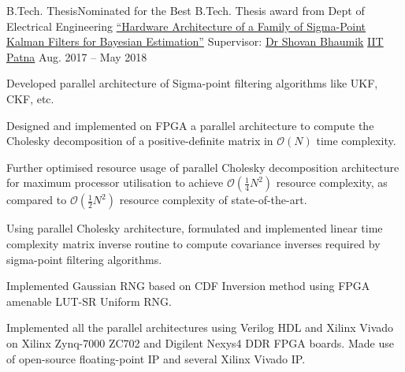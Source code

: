 \begin{cvexperience}
\cvposition
	{B.Tech. Thesis\quad\textbar\quad Nominated for the Best B.Tech. Thesis award from Dept of Electrical Engineering} %
	{\href{https://github.com/haitmak/sigma}{``Hardware Architecture of a Family of Sigma-Point Kalman Filters for Bayesian Estimation''}} %
	{Supervisor: \href{http://www.tutorialpoint.org/ShovanBhaumik/index.html}{Dr Shovan Bhaumik}} %
	{\href{https://www.iitp.ac.in}{IIT Patna}} %
	{Aug. 2017 -- May 2018} %
	{\begin{cvitems} %
		\item {Developed parallel architecture of Sigma-point filtering algorithms like UKF, CKF, etc.}
		\item {Designed and implemented on FPGA a parallel architecture to compute the Cholesky decomposition of a positive-definite matrix in $\mathcal{O} \left( N \right)$ time complexity.}
		\item {Further optimised resource usage of parallel Cholesky decomposition architecture for maximum processor utilisation to achieve $\mathcal{O} \left( \frac{1}{4} N^2 \right)$ resource complexity, as compared to $\mathcal{O} \left( \frac{1}{2} N^2 \right)$ resource complexity of state-of-the-art.}
		\item {Using parallel Cholesky architecture, formulated and implemented linear time complexity matrix inverse routine to compute covariance inverses required by sigma-point filtering algorithms.}
		\item {Implemented Gaussian RNG based on CDF Inversion method using FPGA amenable LUT-SR Uniform RNG.}
		\item {Implemented all the parallel architectures using Verilog HDL and Xilinx Vivado on Xilinx Zynq-7000 ZC702 and Digilent Nexys4 DDR FPGA boards. Made use of open-source floating-point IP and several Xilinx Vivado IP.}
	\end{cvitems}}


\end{cvexperience}
